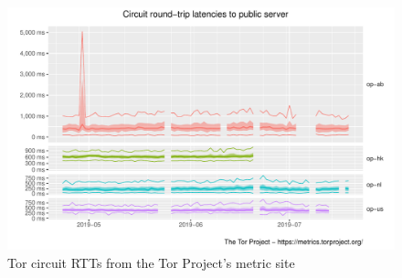 \begin{figure}[t]
\centering
\includegraphics[width=1\columnwidth]{figures/onionperf-latencies-public-2019-04-23-2019-07-22}
\caption{Tor circuit RTTs from the Tor Project's metric site\cite{torperf}}
\label{fig:tor_rtt}
\end{figure}
